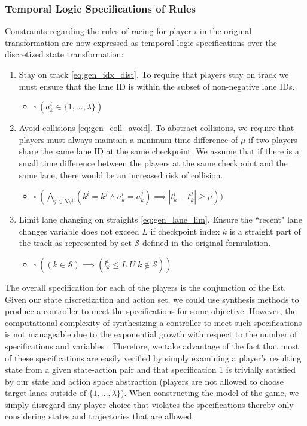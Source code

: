 \subsubsection{Temporal Logic Specifications of Rules} 
Constraints regarding the rules of racing for player $i$ in the original transformation are now expressed as temporal logic specifications over the discretized state transformation:

\begin{enumerate}
    \item Stay on track \eqref{eq:gen_idx_dist}. To require that players stay on track we must ensure that the lane ID is within the subset of non-negative lane IDs.
    \begin{itemize}
        \item $\square \;  (a^i_k \in \{1, ..., \lambda\})$
    \end{itemize} 
    \item Avoid collisions \eqref{eq:gen_coll_avoid}. To abstract collisions, we require that players must always maintain a minimum time difference of $\mu$ if two players share the same lane ID at the same checkpoint. We assume that if there is a small time difference between the players at the same checkpoint and the same lane, there would be an increased risk of collision.
    \begin{itemize}
        \item $\square \;  ( \bigwedge_{j \in N \setminus i} (k^i=k^j \wedge a^i_k=a^j_k) \implies |t^i_k-t^j_k| \geq \mu))$
    \end{itemize}
    \item Limit lane changing on straights \eqref{eq:gen_lane_lim}. Ensure the ``recent" lane changes variable does not exceed $L$ if checkpoint index $k$ is a straight part of the track as represented by set $\mathcal{S}$ defined in the original formulation.
    \begin{itemize}
        \item $\square \; ((k \in \mathcal{S})  \implies (l^i_k \leq   L \; U \; k \notin \mathcal{S}))$
    \end{itemize} 
\end{enumerate}
The overall specification for each of the players is the conjunction of the list. Given our state discretization and action set, we could use synthesis methods to produce a controller to meet the specifications for some objective. However, the computational complexity of synthesizing a controller to meet such specifications is not manageable due to the exponential growth with respect to the number of specifications and variables \cite{Chen2013}. Therefore, we take advantage of the fact that most of these specifications are easily verified by simply examining a player's resulting state from a given state-action pair and that specification 1 is trivially satisfied by our state and action space abstraction (players are not allowed to choose target lanes outside of $\{1, ..., \lambda\}$). When constructing the model of the game, we simply disregard any player choice that violates the specifications thereby only considering states and trajectories that are allowed. 
